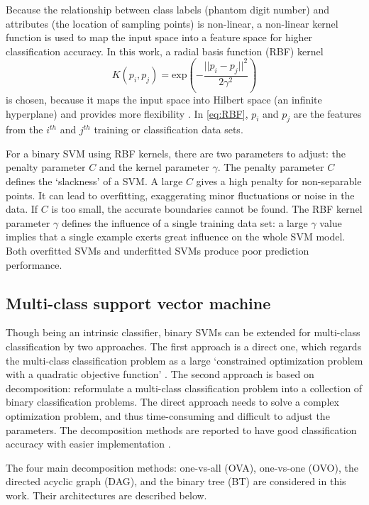 Because the relationship between class labels (phantom digit number) and attributes (the location of sampling points) is non-linear, a non-linear kernel function is used to map the input space into a feature space for higher classification accuracy. 
In this work, a radial basis function (RBF) kernel 
\begin{equation}
\label{eq:RBF}
K(p_i,p_j) = \text{exp}(- \frac{ ||p_i-p_j|| ^2}   {2 \gamma^2})
\end{equation}
is chosen, because it maps the input space into Hilbert space (an infinite hyperplane) and provides more flexibility \cite{amari1999improving}. In \eqref{eq:RBF}, $p_i$ and $p_j$ are the features from the $i^{th}$ and $j^{th}$ training or classification data sets.

For a binary SVM using RBF kernels, there are two parameters to adjust: the penalty parameter $C$ and the kernel parameter $\gamma$. 
The penalty parameter $C$ defines the  `slackness'  of a SVM. A large $C$ gives a high penalty for non-separable points. It can lead to overfitting, exaggerating minor fluctuations or noise in the data. 
If $C$ is too small, the accurate boundaries cannot be found.
The RBF kernel parameter $\gamma$ defines the influence of a single training data set: a large $\gamma$ value implies that a single example exerts great influence on the whole SVM model.  Both overfitted SVMs and underfitted SVMs produce poor prediction performance. 


\subsection{Multi-class support vector machine}
Though being an intrinsic classifier, binary SVMs can be extended for multi-class classification by two approaches.  
The first approach is a direct one, which regards the multi-class classification problem as a large `constrained optimization problem with a quadratic objective function' \cite{crammer2002algorithmic}. The second approach is based on decomposition: reformulate a multi-class classification problem into a collection of binary classification problems.  The direct approach needs to solve a complex optimization problem, and thus time-consuming and difficult to adjust the parameters. The decomposition methods are reported to have good classification accuracy with easier implementation \cite{sabzekar2009improved}.

The four main decomposition methods: one-vs-all (OVA), one-vs-one (OVO), the directed acyclic graph (DAG), and the binary tree (BT)  are considered in this work. Their architectures are described below.


